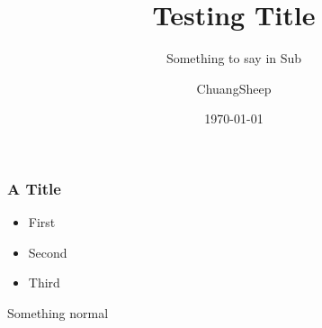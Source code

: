\documentclass[american,aspectratio=169]{beamer}
\title{Testing Title}
\subtitle{Something to say in Sub}
\date{\today}
\author{ChuangSheep}
\begin{document}
\begin{frame} 
  \titlepage
\end{frame} 

\begin{frame}
  \frametitle{A Title}

  \begin{itemize}
    \item First
    \item Second 
    \item Third
  \end{itemize}

  Something normal
\end{frame}
\end{document}
